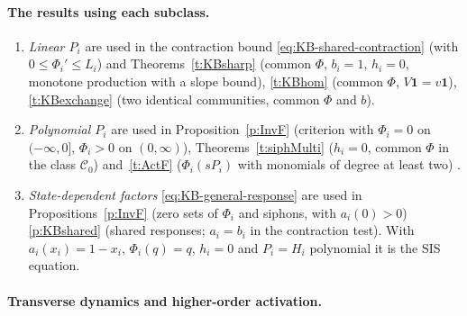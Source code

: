 \paragraph{The results using each subclass.}
\begin{enumerate}

\item \emph{Linear $P_i$} are used in the contraction bound \eqref{eq:KB-shared-contraction} (with
$0\le \Phi_i'\le L_i$) and Theorems~\ref{t:KBsharp} (common $\Phi$, $b_i=1$, $h_i=0$, monotone production with a slope bound), \ref{t:KBhom} (common $\Phi$, $V\mathbf1=v\mathbf1$), \ref{t:KBexchange}
(two identical communities, common $\Phi$ and $b$).

\item \emph{Polynomial $P_i$} are used in Proposition~\ref{p:InvF}
(criterion with $\Phi_i=0$ on $(-\infty,0]$, $\Phi_i>0$ on $(0,\infty)$),
Theorems~\ref{t:siphMulti} ($h_i=0$, common $\Phi$ in the class $\mathcal C_0$)
and~\ref{t:ActF} ($\Phi_i(sP_i)$ with monomials of degree at least two)\nsh{,}
.

\item \emph{State-dependent factors} \eqref{eq:KB-general-response} are used in
Propositions~\ref{p:InvF} (zero sets of $\Phi_i$ and siphons, with
$a_i(0)>0$) \ref{p:KBshared} (shared responses; $a_i=b_i$ in the contraction
test).
With
$a_i(x_i)=1-x_i$, $\Phi_i(q)=q$, $h_i=0$ and $P_i=H_i$ polynomial it is the SIS
equation.
\end{enumerate}

\paragraph{Transverse dynamics and higher-order activation.}

